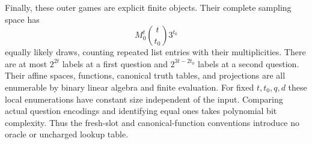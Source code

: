 Finally, these outer games are explicit finite objects. Their complete
sampling space has
\[
 M_0^t\binom{t}{t_0}3^{t_0}
\]
equally likely draws, counting repeated list entries with their
multiplicities. There are at most $2^{2t}$ labels at a first question and
$2^{3t-2t_0}$ labels at a second question. Their affine spaces, functions,
canonical truth tables, and projections are all enumerable by binary
linear algebra and finite evaluation. For fixed $t,t_0,q,d$ these local
enumerations have constant size independent of the input. Comparing
actual question encodings and identifying equal ones takes polynomial
bit complexity. Thus the fresh-slot and canonical-function conventions
introduce no oracle or uncharged lookup table.
